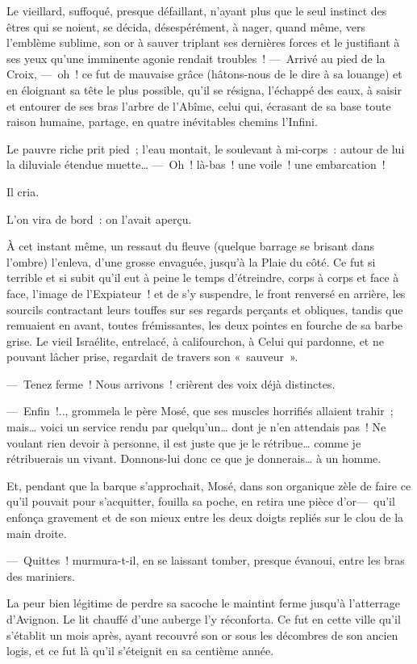 \documentclass[french,twoside]{book} %
\begin{document}
Le vieillard, suffoqué, presque défaillant, n’ayant plus que le seul instinct des êtres qui se noient, se décida, désespérément, à nager, quand même, vers l’emblème sublime, son or à sauver triplant ses dernières forces et le justifiant à ses yeux qu’une imminente agonie rendait troubles ! — Arrivé au pied de la Croix, — oh ! ce fut de mauvaise grâce (hâtons-nous de le dire à sa louange) et en éloignant sa tête le plus possible, qu’il se résigna, l’échappé des eaux, à saisir et entourer de ses bras l’arbre de l’Abîme, celui qui, écrasant de sa base toute raison humaine, partage, en quatre inévitables chemins l’Infini.\par
Le pauvre riche prit pied ; l’eau montait, le   soulevant à mi-corps : autour de lui la diluviale étendue muette… — Oh ! là-bas ! une voile ! une embarcation !\par
Il cria.\par
L’on vira de bord : on l’avait aperçu.\par
À cet instant même, un ressaut du fleuve (quelque barrage se brisant dans l’ombre) l’enleva, d’une grosse envaguée, jusqu’à la Plaie du côté. Ce fut si terrible et si subit qu’il eut à peine le temps d’étreindre, corps à corps et face à face, l’image de l’Expiateur ! et de s’y suspendre, le front renversé en arrière, les sourcils contractant leurs touffes sur ses regards perçants et obliques, tandis que remuaient en avant, toutes frémissantes, les deux pointes en fourche de sa barbe grise. Le vieil Israélite, entrelacé, à califourchon, à Celui qui pardonne, et ne pouvant lâcher prise, regardait de travers son « sauveur ».\par
— Tenez ferme ! Nous arrivons ! crièrent des voix déjà distinctes.\par
— Enfin !.., grommela le père Mosé, que ses muscles horrifiés allaient trahir ; mais… voici   un service rendu par quelqu’un… dont je n’en attendais pas ! Ne voulant rien devoir à personne, il est juste que je le rétribue… comme je rétribuerais un vivant. Donnons-lui donc ce que je donnerais… à un homme.\par
Et, pendant que la barque s’approchait, Mosé, dans son organique zèle de faire ce qu’il pouvait pour s’acquitter, fouilla sa poche, en retira une pièce d’or— qu’il enfonça gravement et de son mieux entre les deux doigts repliés sur le clou de la main droite.\par
— Quittes ! murmura-t-il, en se laissant tomber, presque évanoui, entre les bras des mariniers.\par
La peur bien légitime de perdre sa sacoche le maintint ferme jusqu’à l’atterrage d’Avignon. Le lit chauffé d’une auberge l’y réconforta. Ce fut en cette ville qu’il s’établit un mois après, ayant recouvré son or sous les décombres de son ancien logis, et ce fut là qu’il s’éteignit en sa centième année.\par
\end{document}
